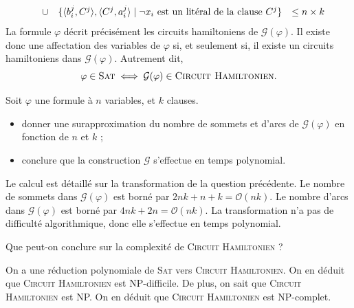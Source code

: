 \begin{exercice}[\textsc{Circuit Hamiltonien} est NP-complet%
    \footnote{Vidéo détaillée de la réduction de \textsc{3-SAT} à \textsc{Cycle Hamiltonien} : \url{https://www.youtube.com/watch?v=OHnX-R_SBpM}}]
\begin{correction}
$$\begin{array}{rcl@{\quad}l}
      &\cup& \{ \langle b_i^j, C^j \rangle,            \langle C^j, a_i^j \rangle            \mid \lnot x_i \text{ est un litéral de la clause } C^j \}    & \le n \times k
    \end{array}
    $$
    La formule $\varphi$ décrit précisément les circuits hamiltoniens de $\mathcal{G}(\varphi)$.
    Il existe donc une affectation des variables de $\varphi$ si, et seulement si,
    il existe un circuits hamiltoniens dans $\mathcal{G}(\varphi)$.
    Autrement dit, $$\varphi \in \textsc{Sat} \iff \mathcal{G}(\varphi) \in \textsc{Circuit Hamiltonien}.$$
  \end{correction}
  
  \begin{question}
  \item Soit $\varphi$ une formule à $n$ variables, et $k$ clauses.
    \begin{itemize}
    \item donner une surapproximation du nombre de sommets et d'arcs de $\mathcal{G}(\varphi)$ en fonction de $n$ et $k$ ;
    \item conclure que la construction $\mathcal{G}$ s'effectue en temps polynomial.
    \end{itemize}
  \end{question}
  \begin{correction}
    Le calcul est détaillé sur la transformation de la question précédente.
    Le nombre de sommets dans $\mathcal{G}(\varphi)$ est borné par $2 n k + n + k = \mathcal{O}(n k)$.
    Le nombre d'arcs dans $\mathcal{G}(\varphi)$ est borné par $4 n k + 2 n = \mathcal{O}(n k)$.
    La transformation n'a pas de difficulté algorithmique, donc elle s'effectue en temps polynomial.
  \end{correction}
  
  \begin{question}
  \item Que peut-on conclure sur la complexité de \textsc{Circuit Hamiltonien} ? 
  \end{question}
  \begin{correction}
    On a une réduction polynomiale de \textsc{Sat} vers \textsc{Circuit Hamiltonien}.
    On en déduit que \textsc{Circuit Hamiltonien} est NP-difficile.
    De plus, on sait que \textsc{Circuit Hamiltonien} est NP.
    On en déduit que \textsc{Circuit Hamiltonien} est NP-complet.
  \end{correction}

\end{exercice}

\endgroup
\endinput
